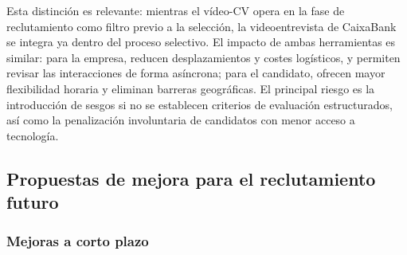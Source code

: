 Esta distinción es relevante: mientras el vídeo-CV opera en la fase de reclutamiento
como filtro previo a la selección, la videoentrevista de CaixaBank se integra ya dentro
del proceso selectivo. El impacto de ambas herramientas es similar: para la empresa,
reducen desplazamientos y costes logísticos, y permiten revisar las interacciones de
forma asíncrona; para el candidato, ofrecen mayor flexibilidad horaria y eliminan
barreras geográficas. El principal riesgo es la introducción de sesgos si no se
establecen criterios de evaluación estructurados, así como la penalización involuntaria
de candidatos con menor acceso a tecnología.

\subsection{Propuestas de mejora para el reclutamiento futuro}

\subsubsection{Mejoras a corto plazo}

